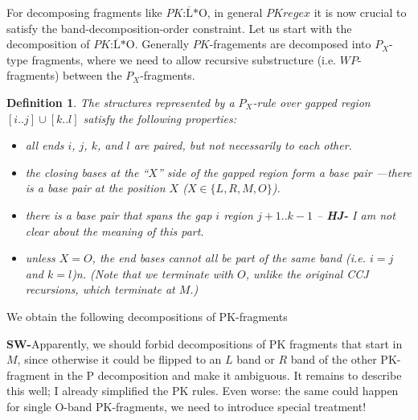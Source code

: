 \documentclass[11pt]{article} %
\newtheorem{definition}{Definition}
\newcommand{\SW}[1]{\textbf{SW-}#1}
\newcommand{\PKnone}{P\!K}
\newcommand{\lO}{\text{:$\overline{\text{L}}$*O}}
\begin{document}
For decomposing fragments like $\PKnone\lO$, in general $\PKnone{regex}$ it is now crucial to satisfy the band-decomposition-order constraint.
Let us start with the decomposition of $\PKnone\lO$. Generally $PK$-fragements are decomposed into $P_X$-type fragments, where we
need to allow recursive substructure (i.e. $WP$-fragments) between the $P_X$-fragments.

\begin{definition}
The structures represented by a $P_X$-rule over gapped region $[i..j]\cup [k..l]$ satisfy the following properties:
\begin{itemize}
\item all ends $i$, $j$, $k$, and $l$ are paired, but not necessarily to each other.
\item the closing bases at the ``$X$'' side of the gapped region form a base pair%
---there is a base pair at the position $X$ ($X\in\{L,R,M,O\}$).
\item there is a base pair that spans the gap $i$ region $j+1..k-1$ -- \textbf{HJ-} I am not clear about the meaning of this part.
\item unless $X=O$, the end bases cannot all be part of the same band (i.e. $i=j$ and $k=l$)n. (Note that we terminate with $O$, unlike the original CCJ recursions, which terminate at $M$.)
\end{itemize}
\end{definition}


We obtain the following decompositions of PK-fragments 

\SW{Apparently, we should forbid decompositions of PK fragments that start in $M$, since otherwise it could be flipped to an $L$ band or $R$ band of the other PK-fragment in the P decomposition and make it ambiguous. It remains to describe this well; I already simplified the PK rules. Even worse: the same could happen for single O-band PK-fragments, we need to introduce special treatment!}
\end{document}
